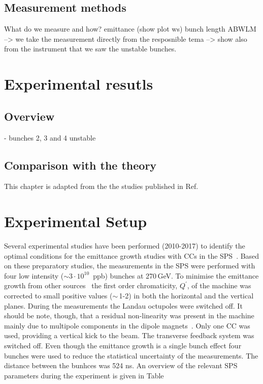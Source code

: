 \subsection{Measurement methods}
 What do we measure and how? emittance (show plot ws)
 bunch length ABWLM --> we take the measurement directly from the resposnible tema
 --> show also from the instrument that we saw the unstable bunches.

 \section{Experimental resutls}
 \subsection{Overview}
 - bunches 2, 3 and 4 unstable
 \subsection{Comparison with the theory}

 \newpage 
 This chapter is adapted from the the studies published in Ref.~\cite{Triantafyllou}

 \section{Experimental Setup} %

Several experimental studies have been performed (2010-2017) to identify the optimal conditions for the emittance growth studies with CCs in the SPS~\cite{Calaga:1451286, Antoniou:2649815}. Based on these preparatory studies, the measurements in the SPS were performed with four low intensity ($\sim 3 \cdot 10^{10}$\, ppb) bunches at 270\,GeV. To minimise the emittance growth from other sources~\cite{Antoniou:2649815} the first order chromaticity, $Q^\prime$, of the machine was corrected to small positive values ($\sim$\,1-2) in both the horizontal and the vertical planes. During the measurements the Landau octupoles were switched off. It should be note, though, that a residual non-linearity was present in the machine mainly due to multipole components in the dipole magnets~\cite{Carlà:2664976, Alekou:2640326}. Only one CC was used, providing a vertical kick to the beam. The transverse feedback system was switched off. Even though the emittance growth is a single bunch effect four bunches were used to reduce the statistical uncertainty of the measurements. The distance between the bunhces was 524 ns. An overview of the relevant SPS parameters during the experiment is given in Table%


